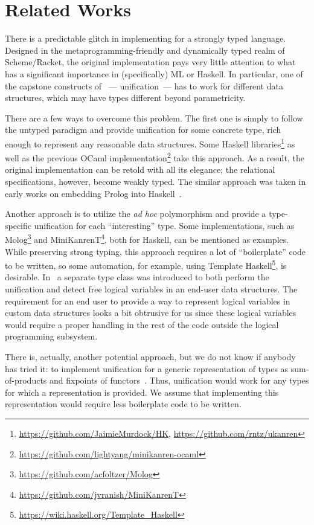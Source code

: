 \section{Related Works}
\label{sec:relworks}

There is a predictable glitch in implementing \miniKanren for a strongly typed language. 
Designed in the metaprogramming-friendly and dynamically typed realm of Scheme/Racket, the original 
\miniKanren implementation pays very little attention to what has a significant importance in (specifically) 
ML or Haskell. In particular, one of the capstone constructs of \miniKanren~--- unification~--- has to work for 
different data structures, which may have types different beyond parametricity. 

There are a few ways to overcome this problem. The first one is simply to follow the untyped paradigm and
provide unification for some concrete type, rich enough to represent any reasonable data structures.
Some Haskell \miniKanren libraries\footnote{\url{https://github.com/JaimieMurdock/HK}, \url{https://github.com/rntz/ukanren}}
as well as the previous OCaml implementation\footnote{\url{https://github.com/lightyang/minikanren-ocaml}} take this approach. 
As a result, the original implementation can be retold with all its elegance; the relational specifications, however,
become weakly typed. The similar approach was taken in early works on embedding Prolog into Haskell~\cite{PrologInHaskell}.

Another approach is to utilize the \emph{ad hoc} polymorphism and provide a type-specific unification for each ``interesting'' type. 
Some \miniKanren implementations, such as Molog\footnote{\url{https://github.com/acfoltzer/Molog}} and 
MiniKanrenT\footnote{\url{https://github.com/jvranish/MiniKanrenT}}, both for Haskell, can be mentioned as examples. 
While preserving strong typing, this approach requires a lot of ``boilerplate'' 
code to be written, so some automation, for example, using Template Haskell\footnote{\url{https://wiki.haskell.org/Template_Haskell}},
is desirable. In~\cite{TypedLogicalVariables} a separate type class was introduced to both perform the unification 
and detect free logical variables in an end-user data structures. The requirement for an end user to provide a way to represent
logical variables in custom data structures looks a bit obtrusive for us since these logical variables would require a proper
handling in the rest of the code outside the logical programming subsystem. 

There is, actually, another potential approach, but we do not know if anybody has tried
it: to implement unification for a generic representation of types as sum-of-products and fixpoints of 
functors~\cite{InstantGenerics, ALaCarte}. Thus, unification would work for any types for which a representation
is provided. We assume that implementing this representation would require less boilerplate code to be written.

